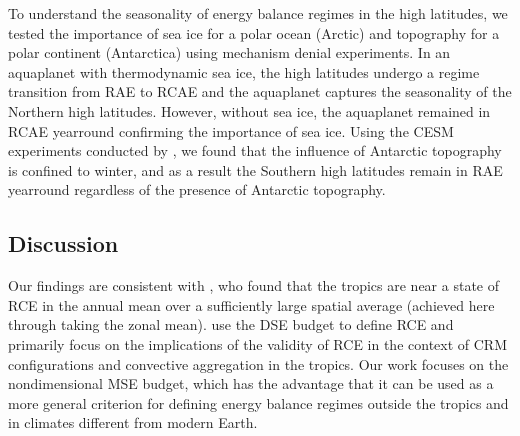 \documentclass{ametsocV5}
\begin{document}
To understand the seasonality of energy balance regimes in the high latitudes, we tested the importance of sea ice for a polar ocean (Arctic) and topography for a polar continent (Antarctica) using mechanism denial experiments. In an aquaplanet with thermodynamic sea ice, the high latitudes undergo a regime transition from RAE to RCAE and the aquaplanet captures the seasonality of the Northern high latitudes. However, without sea ice, the aquaplanet remained in RCAE yearround confirming the importance of sea ice. Using the CESM experiments conducted by \cite{hahn2020}, we found that the influence of Antarctic topography is confined to winter, and as a result the Southern high latitudes remain in RAE yearround regardless of the presence of Antarctic topography.


\subsection{Discussion}
Our findings are consistent with \cite{jakob2019}, who found that the tropics are near a state of RCE in the annual mean over a sufficiently large spatial average (achieved here through taking the zonal mean). \cite{jakob2019} use the DSE budget to define RCE and primarily focus on the implications of the validity of RCE in the context of CRM configurations and convective aggregation in the tropics. Our work focuses on the nondimensional MSE budget, which has the advantage that it can be used as a more general criterion for defining energy balance regimes outside the tropics and in climates different from modern Earth.

\end{document}
